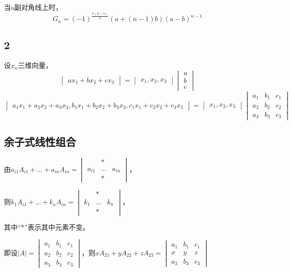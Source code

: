 当a副对角线上时，
\[
G_n = (-1)^{\frac{n(n - 1)}{2}}(a + (n - 1)b)(a - b)^{n - 1}
\]


\subsection{2}

设\(x_n\)三维向量，
\[
\begin{vmatrix}
a x_1 + b x_2 + c x_3
\end{vmatrix} = 
\begin{vmatrix}
x_1, x_2, x_3
\end{vmatrix}
\begin{vmatrix}
a \\ 
b \\ 
c
\end{vmatrix}
\]
\[
\begin{vmatrix}
a_1 x_1 + a_2 x_2 + a_3 x_3, b_1 x_1 + b_2 x_2 + b_3 x_3, c_1 x_1 + c_2 x_2 + c_3 x_3
\end{vmatrix} = 
\begin{vmatrix}
x_1, x_2, x_3
\end{vmatrix}
\begin{vmatrix}
a_1 & b_1 & c_1 \\ 
a_2 & b_2 & c_2 \\ 
a_3 & b_3 & c_3
\end{vmatrix}
\]


\subsection{余子式线性组合}

由\(a_{i1}A_{i1} + ... + a_{in}A_{in} = 
\begin{vmatrix}
 & * & \\ 
a_{i1} & ... & a_{in} \\ 
 & * & 
\end{vmatrix}
\)，

则\(k_{1}A_{i1} + ... + k_{n}A_{in} = 
\begin{vmatrix}
 & * & \\ 
k_{1} & ... & k_{n} \\ 
 & * & 
\end{vmatrix}
\)，

其中“*”表示其中元素不变。

即设\(|A| = 
\begin{vmatrix}
a_1 & b_1 & c_1 \\ 
a_2 & b_2 & c_2 \\ 
a_3 & b_3 & c_3
\end{vmatrix}
\)，则\(xA_{21} + yA_{22} + zA_{23} = 
\begin{vmatrix}
a_1 & b_1 & c_1 \\ 
x & y & z \\ 
a_3 & b_3 & c_3
\end{vmatrix}
\)


